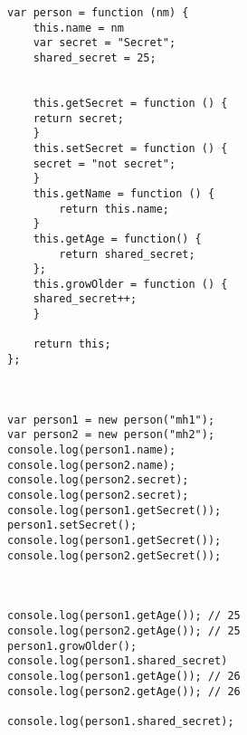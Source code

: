 \begin{verbatim}
var person = function (nm) {
	this.name = nm  
	var secret = "Secret";  
    shared_secret = 25; 
	
	
	this.getSecret = function () {
	return secret;
	}
	this.setSecret = function () {
	secret = "not secret";
	}
    this.getName = function () {
        return this.name;
    }
	this.getAge = function() {
		return shared_secret;
	};
	this.growOlder = function () {
	shared_secret++;
	}

    return this;
};



var person1 = new person("mh1");
var person2 = new person("mh2");
console.log(person1.name); 
console.log(person2.name); 
console.log(person2.secret); 
console.log(person2.secret); 
console.log(person1.getSecret());
person1.setSecret();
console.log(person1.getSecret());
console.log(person2.getSecret());



console.log(person1.getAge()); // 25
console.log(person2.getAge()); // 25
person1.growOlder();
console.log(person1.shared_secret)
console.log(person1.getAge()); // 26
console.log(person2.getAge()); // 26

console.log(person1.shared_secret);
\end{verbatim}
